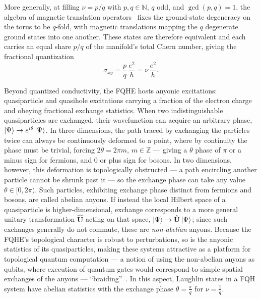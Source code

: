 More generally, at filling $\nu = p/q$ with $p, q \in \mathbb{N}$, $q$ odd, and $\gcd(p,q)=1$, the algebra of magnetic translation operators~\cite{bernevig2012emergent} fixes the ground-state degeneracy on the torus to be $q$-fold, with magnetic translations mapping the $q$ degenerate ground states into one another. These states are therefore equivalent and each carries an equal share $p/q$ of the manifold's total Chern number, giving the fractional quantization
\begin{equation}
    \sigma_{xy} = \frac{p}{q} \, \frac{e^2}{h} = \nu \, \frac{e^2}{h}.
\end{equation}

Beyond quantized conductivity, the FQHE hosts anyonic excitations: quasiparticle and quasihole excitations carrying a fraction of the electron charge and obeying fractional exchange statistics. When two indistinguishable quasiparticles are exchanged, their wavefunction can acquire an arbitrary phase, $\ket{\Psi} \to e^{i\theta}\ket{\Psi}$. In three dimensions, the path traced by exchanging the particles twice can always be continuously deformed to a point, where by continuity the phase must be trivial, forcing $2\theta = 2\pi m,\,m\in\mathbb{Z}$ --- giving a $\theta$ phase of $\pi$ or a minus sign for fermions, and $0$ or plus sign for bosons. In two dimensions, however, this deformation is topologically obstructed --- a path encircling another particle cannot be shrunk past it --- so the exchange phase can take any value $\theta \in [0, 2\pi)$. Such particles, exhibiting exchange phase distinct from fermions and bosons, are called abelian anyons. If instead the local Hilbert space of a quasiparticle is higher-dimensional, exchange corresponds to a more general unitary transformation $\hat{\mathbf{U}}$ acting on that space, $\ket{\Psi} \to \hat{\mathbf{U}}\ket{\Psi}$; since such exchanges generally do not commute, these are \textit{non-abelian} anyons. Because the FQHE's topological character is robust to perturbations, so is the anyonic statistics of its quasiparticles, making these systems attractive as a platform for topological quantum computation --- a notion of using the non-abelian anyons as qubits, where execution of quantum gates would correspond to simple spatial exchanges of the anyons --- ``braiding''~\cite{das2005topologically, nayak2008non}.
        In this aspect, Laughlin states in a FQH system have abelian statistics with the exchange phase $\theta = \frac{\pi}{q}$ for $\nu = \frac{1}{q}$.

